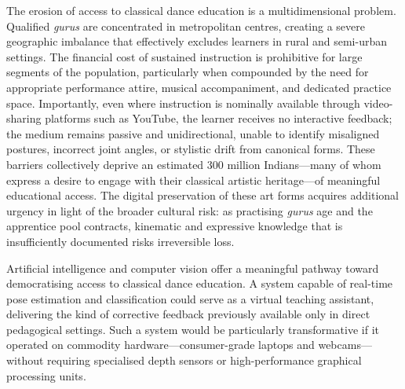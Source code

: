 \documentclass[journal]{IEEEtran}
\begin{document}
The erosion of access to classical dance education is a multidimensional
problem. Qualified \textit{gurus} are concentrated in metropolitan
centres, creating a severe geographic imbalance that effectively
excludes learners in rural and semi-urban settings. The financial cost
of sustained instruction is prohibitive for large segments of the
population, particularly when compounded by the need for appropriate
performance attire, musical accompaniment, and dedicated practice
space. Importantly, even where instruction is nominally available
through video-sharing platforms such as YouTube, the learner receives
no interactive feedback; the medium remains passive and unidirectional,
unable to identify misaligned postures, incorrect joint angles, or
stylistic drift from canonical forms. These barriers collectively
deprive an estimated 300 million Indians—many of whom express a desire
to engage with their classical artistic heritage—of meaningful
educational access. The digital preservation of these art forms
acquires additional urgency in light of the broader cultural risk:
as practising \textit{gurus} age and the apprentice pool contracts,
kinematic and expressive knowledge that is insufficiently documented
risks irreversible loss.

Artificial intelligence and computer vision offer a meaningful pathway
toward democratising access to classical dance education. A system
capable of real-time pose estimation and classification could serve as
a virtual teaching assistant, delivering the kind of corrective feedback
previously available only in direct pedagogical settings. Such a system
would be particularly transformative if it operated on commodity
hardware—consumer-grade laptops and webcams—without requiring
specialised depth sensors or high-performance graphical processing
units.
\end{document}
